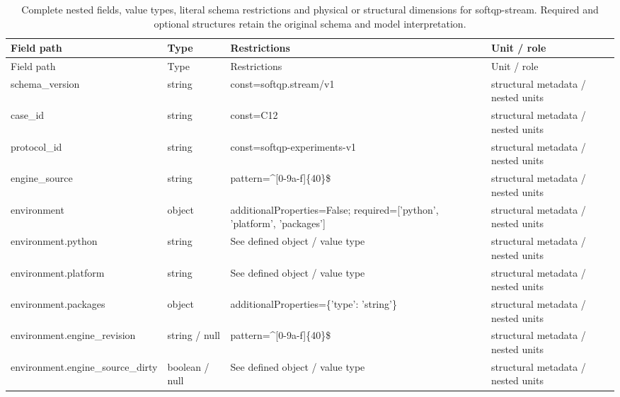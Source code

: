 \begingroup\footnotesize\setlength{\tabcolsep}{3pt}
\begin{longtable}{@{}>{\raggedright\arraybackslash}p{}>{\raggedright\arraybackslash}p{}>{\raggedright\arraybackslash}p{}>{\raggedright\arraybackslash}p{}@{}}
\caption{Complete nested fields, value types, literal schema restrictions and physical or structural dimensions for softqp-stream. Required and optional structures retain the original schema and model interpretation.}\label{tab:nested-softqp-stream}\\
\toprule Field path & Type & Restrictions & Unit / role\\\midrule\endfirsthead
\toprule Field path & Type & Restrictions & Unit / role\\\midrule\endhead
\bottomrule\endfoot
schema\_\allowbreak{}version & string & const=\allowbreak{}softqp.\allowbreak{}stream/\allowbreak{}v1 & structural metadata /\allowbreak{} nested units\\
case\_\allowbreak{}id & string & const=\allowbreak{}C12 & structural metadata /\allowbreak{} nested units\\
protocol\_\allowbreak{}id & string & const=\allowbreak{}softqp-\allowbreak{}experiments-\allowbreak{}v1 & structural metadata /\allowbreak{} nested units\\
engine\_\allowbreak{}source & string & pattern=\allowbreak{}\textasciicircum{}[0-9a-\allowbreak{}f]\{40\}\$ & structural metadata /\allowbreak{} nested units\\
environment & object & additionalProperties=\allowbreak{}False; required=\allowbreak{}['python', 'platform', 'packages'] & structural metadata /\allowbreak{} nested units\\
environment.\allowbreak{}python & string & See defined object /\allowbreak{} value type & structural metadata /\allowbreak{} nested units\\
environment.\allowbreak{}platform & string & See defined object /\allowbreak{} value type & structural metadata /\allowbreak{} nested units\\
environment.\allowbreak{}packages & object & additionalProperties=\allowbreak{}\{'type': 'string'\} & structural metadata /\allowbreak{} nested units\\
environment.\allowbreak{}engine\_\allowbreak{}revision & string /\allowbreak{} null & pattern=\allowbreak{}\textasciicircum{}[0-9a-\allowbreak{}f]\{40\}\$ & structural metadata /\allowbreak{} nested units\\
environment.\allowbreak{}engine\_\allowbreak{}source\_\allowbreak{}dirty & boolean /\allowbreak{} null & See defined object /\allowbreak{} value type & structural metadata /\allowbreak{} nested units\\

\end{longtable}
